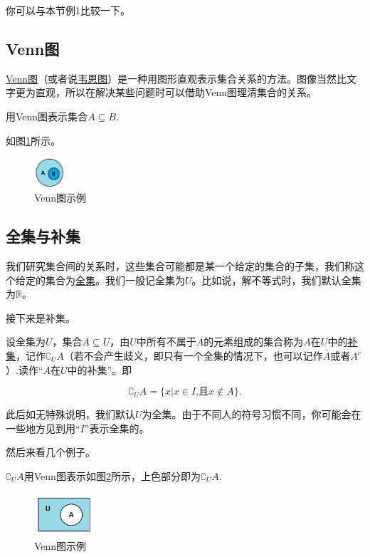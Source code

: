 \documentclass[lang=cn,math=cm,chinesefont=nofont,11pt,scheme=chinese,onecol]{elegantbook}
\begin{document}
\begin{remark}
  你可以与本节例1比较一下。
\end{remark}

\subsection{Venn图}
  \underline{Venn图}（或者说\underline{韦恩图}）是一种用图形直观表示集合关系的方法。图像当然比文字更为直观，所以在解决某些问题时可以借助Venn图理清集合的关系。

\begin{example}
  用Venn图表示集合$A\subseteq B$.
\end{example}
\begin{solution}
  如图\ref{img:Venn1}所示。
\end{solution}
\begin{figure}[h]
  \centering
  \includegraphics[width=0.1\textwidth]{image/Venn1.png}
  \caption{Venn图示例}
  \label{img:Venn1}
\end{figure}

\subsection{全集与补集}
  我们研究集合间的关系时，这些集合可能都是某一个给定的集合的子集，我们称这个给定的集合为\underline{全集}。我们一般记全集为$U$。比如说，解不等式时，我们默认全集为$\mathbb{R}$。

  接下来是补集。
\begin{definition}
  设全集为$U$，集合$A\subseteq U$，由$U$中所有不属于$A$的元素组成的集合称为$A$在$U$中的\underline{补集}，记作${\complement}_{U}A$（若不会产生歧义，即只有一个全集的情况下，也可以记作$\overline{A}$或者$A^c$）.读作“$A$在$U$中的补集”。即

  $${\complement}_{U}A=\{x|x\in I\text{,且}x\notin A\}.$$
\end{definition}
\begin{remark}
  此后如无特殊说明，我们默认$U$为全集。由于不同人的符号习惯不同，你可能会在一些地方见到用“$I$”表示全集的。
\end{remark}
  然后来看几个例子。
\begin{example}
  $\complement_{U}A$用Venn图表示如图\ref{img:Venn3}所示，上色部分即为$\complement_{U}A$.
\end{example}
\begin{figure}[h]
  \centering
  \includegraphics[width=0.2\textwidth]{image/Venn3.png}
  \caption{Venn图示例}
  \label{img:Venn3}
\end{figure}
\end{document}
